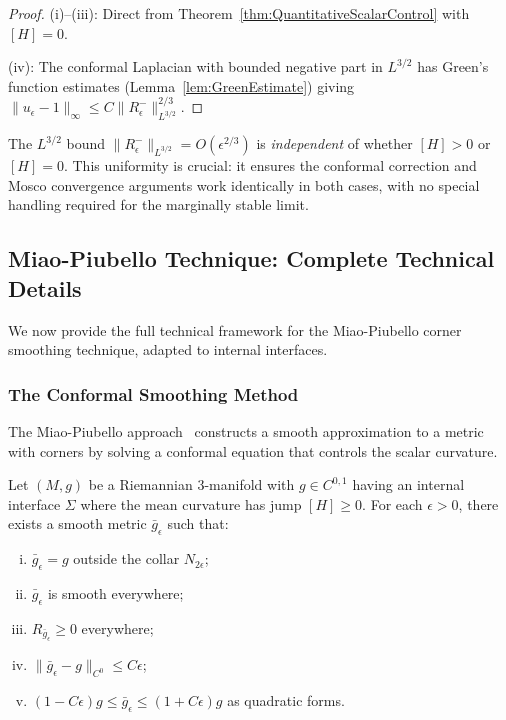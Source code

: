 \begin{proof}
(i)--(iii): Direct from Theorem~\ref{thm:QuantitativeScalarControl} with $[H] = 0$.

(iv): The conformal Laplacian with bounded negative part in $L^{3/2}$ has Green's function estimates (Lemma~\ref{lem:GreenEstimate}) giving $\|u_\epsilon - 1\|_\infty \le C \|R^-_\epsilon\|_{L^{3/2}}^{2/3}$.
\end{proof}

\begin{remark}
The $L^{3/2}$ bound $\|R^-_\epsilon\|_{L^{3/2}} = O(\epsilon^{2/3})$ is \emph{independent} of whether $[H] > 0$ or $[H] = 0$. This uniformity is crucial: it ensures the conformal correction and Mosco convergence arguments work identically in both cases, with no special handling required for the marginally stable limit.
\end{remark}

\subsection{Miao-Piubello Technique: Complete Technical Details}
\label{sec:MiaoPiubelloComplete}

We now provide the full technical framework for the Miao-Piubello corner smoothing technique, adapted to internal interfaces.

\subsubsection{The Conformal Smoothing Method}

The Miao-Piubello approach~\cite{miao2002, miao2012} constructs a smooth approximation to a metric with corners by solving a conformal equation that controls the scalar curvature.

\begin{theorem}
\label{thm:MiaoPiubelloFull}
Let $(M, g)$ be a Riemannian 3-manifold with $g \in C^{0,1}$ having an internal interface $\Sigma$ where the mean curvature has jump $[H] \ge 0$. For each $\epsilon > 0$, there exists a smooth metric $\bar{g}_\epsilon$ such that:
\begin{enumerate}[(i)]
\item $\bar{g}_\epsilon = g$ outside the collar $N_{2\epsilon}$;
\item $\bar{g}_\epsilon$ is smooth everywhere;
\item $R_{\bar{g}_\epsilon} \ge 0$ everywhere;
\item $\|\bar{g}_\epsilon - g\|_{C^0} \le C\epsilon$;
\item $(1 - C\epsilon) g \le \bar{g}_\epsilon \le (1 + C\epsilon) g$ as quadratic forms.
\end{enumerate}
\end{theorem}

